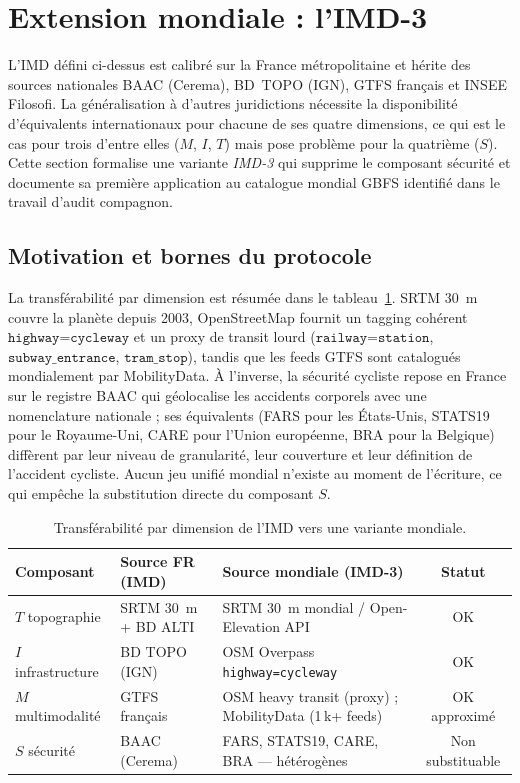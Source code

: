 \documentclass[11pt,a4paper]{article}
\begin{document}
\section{Extension mondiale : l'IMD-3}
\label{sec:imd3}

L'IMD défini ci-dessus est calibré sur la France métropolitaine
et hérite des sources nationales BAAC (Cerema), BD~TOPO (IGN),
GTFS français et INSEE Filosofi. La généralisation à d'autres
juridictions nécessite la disponibilité d'équivalents
internationaux pour chacune de ses quatre dimensions, ce qui
est le cas pour trois d'entre elles ($M$, $I$, $T$) mais pose
problème pour la quatrième ($S$). Cette section formalise une
variante \emph{IMD-3} qui supprime le composant sécurité et
documente sa première application au catalogue mondial GBFS
identifié dans le travail d'audit compagnon.

\subsection{Motivation et bornes du protocole}

La transférabilité par dimension est résumée dans le
tableau~\ref{tab:imd3-sources}. SRTM 30~m couvre la planète
depuis 2003, OpenStreetMap fournit un tagging cohérent
$\texttt{highway=cycleway}$ et un proxy de transit lourd
($\texttt{railway=station}$, $\texttt{subway\_entrance}$,
$\texttt{tram\_stop}$), tandis que les feeds GTFS sont
catalogués mondialement par MobilityData. À l'inverse, la
sécurité cycliste repose en France sur le registre BAAC qui
géolocalise les accidents corporels avec une nomenclature
nationale ; ses équivalents (FARS pour les États-Unis, STATS19
pour le Royaume-Uni, CARE pour l'Union européenne, BRA pour la
Belgique) diffèrent par leur niveau de granularité, leur
couverture et leur définition de l'accident cycliste. Aucun jeu
unifié mondial n'existe au moment de l'écriture, ce qui
empêche la substitution directe du composant $S$.

\begin{table}[H]
\centering
\caption{Transférabilité par dimension de l'IMD vers une variante
mondiale.}
\label{tab:imd3-sources}
\small
\begin{tabular}{@{}lllc@{}}
\toprule
\textbf{Composant} & \textbf{Source FR (IMD)} & \textbf{Source mondiale (IMD-3)} & \textbf{Statut}\\
\midrule
$T$ topographie     & SRTM 30~m + BD ALTI & SRTM 30~m mondial / Open-Elevation API & OK \\
$I$ infrastructure  & BD TOPO (IGN)       & OSM Overpass \texttt{highway=cycleway}  & OK \\
$M$ multimodalité   & GTFS français       & OSM heavy transit (proxy) ; MobilityData (1\,k+ feeds) & OK approximé \\
$S$ sécurité        & BAAC (Cerema)       & FARS, STATS19, CARE, BRA --- hétérogènes & Non substituable \\
\bottomrule
\end{tabular}
\end{table}
\end{document}
